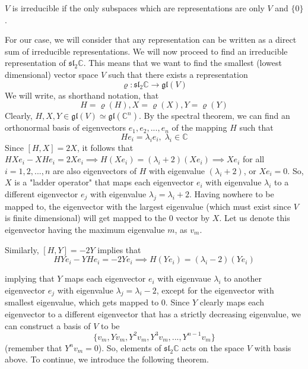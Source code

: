   \begin{definition}
    $V$ is irreducible if the only subspaces which are representations are only $V$ and $\{0\}$. 
  \end{definition}

  For our case, we will consider that any representation can be written as a direct sum of irreducible representations. We will now proceed to find an irreducible representation of $\mathfrak{sl}_2 \mathbb{C}$. This means that we want to find the smallest (lowest dimensional) vector space $V$ such that there exists a representation
  \begin{equation}
    \varrho: \mathfrak{sl}_2 \mathbb{C} \rightarrow \mathfrak{gl}(V)
  \end{equation}
  We will write, as shorthand notation, that 
  \begin{equation}
    H = \varrho(H), X = \varrho(X), Y = \varrho(Y)
  \end{equation}
  Clearly, $H, X, Y \in \mathfrak{gl}(V) \simeq \mathfrak{gl}(\mathbb{C}^n)$. By the spectral theorem, we can find an orthonormal basis of eigenvectors $e_1, e_2, ..., e_n$ of the mapping $H$ such that
  \begin{equation}
    H e_i = \lambda_i e_i, \; \lambda_i \in \mathbb{C}
  \end{equation}
  Since $[H,X] = 2X$, it follows that $HX e_i - X H e_i = 2X e_i \implies H (X e_i) = (\lambda_i + 2) (X e_i) \implies Xe_i$ for all $i = 1, 2, ..., n$ are also eigenvectors of $H$ with eigenvalue $(\lambda_i + 2)$, or $X e_i = 0$. So, $X$ is a "ladder operator" that maps each eigenvector $e_i$ with eigenvalue $\lambda_i$ to a different eigenvector $e_j$ with eigenvalue $\lambda_j = \lambda_i + 2$. Having nowhere to be mapped to, the eigenvector with the largest eigenvalue (which must exist since $V$ is finite dimensional) will get mapped to the $0$ vector by $X$. Let us denote this eigenvector having the maximum eigenvalue $m$, as $v_m$. 

  Similarly, $[H,Y] = -2Y$ implies that
  \begin{equation}
    HY e_i - YH e_i = -2Y e_i \implies H(Y e_i) = (\lambda_i - 2)(Y e_i)
  \end{equation}

  implying that $Y$ maps each eigenvector $e_i$ with eigenvaue $\lambda_i$ to another eigenvector $e_j$ with eigenvalue $\lambda_j = \lambda_i - 2$, except for the eigenvector with smallest eigenvalue, which gets mapped to $0$. Since $Y$ clearly maps each eigenvector to a different eigenvector that has a strictly decreasing eigenvalue, we can construct a basis of $V$ to be
  \begin{equation}
    \{v_m, Y v_m, Y^2 v_m, Y^3 v_m, ..., Y^{n-1} v_m\}
  \end{equation}
  (remember that $Y^n v_m = 0$). So, elements of $\mathfrak{sl}_2 \mathbb{C}$ acts on the space $V$ with basis above. To continue, we introduce the following theorem. 

